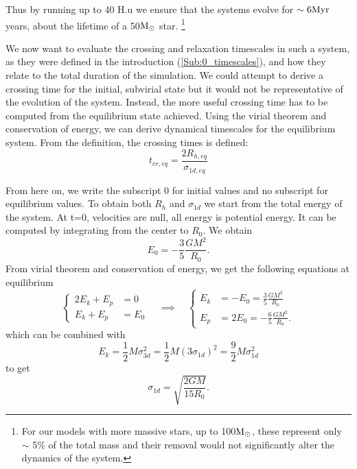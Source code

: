 Thus by running up to 40 H.u we ensure that the systems evolve for $ \sim  6 {\textrm{Myr}} $ years, about the lifetime of a 50${\textrm{M}_\odot}$ star. \footnote{For our models with more massive stars, up to 100${\textrm{M}_\odot}$, these represent only $\sim$ 5\% of the total mass and their removal would not significantly alter the dynamics of the system.}

We now want to evaluate the crossing and relaxation timescales in such a system, as they were defined in the introduction (\ref{Sub:0_timescales}), and how they relate to the total duration of the simulation. We could attempt to derive a crossing time for the initial, subvirial state but it would not be representative of the evolution of the system. Instead, the more useful crossing time has to be computed from the equilibrium state achieved. Using the virial theorem and conservation of energy, we can derive dynamical timescales for the equilibrium system. From the definition, the crossing times is defined:
\begin{equation}
\label{Eq:3_tcr}
t_{cr,eq} = \frac{2 R_{h,eq}}{\sigma_{1d,eq}}
\end{equation}

From here on, we write the subscript 0 for initial values and no subscript for equilibrium values. To obtain both $R_{h}$ and $\sigma_{1d}$ we start from the total energy of the system. At t=0, velocities are null, all energy is potential energy. It can be computed by integrating from the center to $R_0$. We obtain
\begin{equation}
E_0 = - \frac{3}{5} \frac{G M^2}{R_0}.
\end{equation}
From virial theorem and conservation of energy, we get the following equations at equilibrium
\begin{equation}
\label{Eq:3_energies}
\begin{cases}
2 E_k + E_p &=0\\
E_k + E_p &= E_0
\end{cases} 
\quad
\implies
\quad
\begin{cases}
E_k &= -E_0 = \frac{3}{5} \frac{G M^2}{R_0}\\
E_p &= 2 E_0 = - \frac{6}{5} \frac{G M^2}{R_0}.
\end{cases}
\end{equation}
which can be combined with
\begin{equation}
E_k = \frac{1}{2} M \sigma_{3d}^2 = \frac{1}{2} M (3 \sigma_{1d} )^2 = \frac{9}{2} M \sigma_{1d}^2
\end{equation}
to get
\begin{equation}
\sigma_{1d} = \sqrt{\frac{2 G M}{15 R_0}}.
\end{equation}

